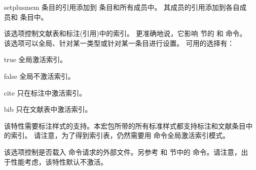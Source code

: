 \begin{optionlist}
\begin{valuelist}
\item[setplusmem] %
 条目的引用添加到   条目和所有成员中。
其成员的引用添加到各自成员和  条目中。

\end{valuelist}


该选项控制文献表和标注(引用)中的索引。
更准确地说，它影响  节的  和  命令。
该选项可以全局、针对某一类型或针对某一条目进行设置。
可用的选择有：

\begin{valuelist}
\item[true] %
全局激活索引。
\item[false] %
全局不激活索引。
\item[cite] %
只在标注中激活索引。
\item[bib] %
只在文献表中激活索引。
\end{valuelist}

该特性需要标注样式的支持。本宏包所带的所有标准样式都支持标注和文献条目中的索引。
请注意，为了得到索引表，仍然需要用  命令全局激活索引模式。


该选项控制是否载入  命令请求的外部文件。另参考  和  节中的  命令。请注意，出于性能考虑，该特性默认不激活。


\end{optionlist}
